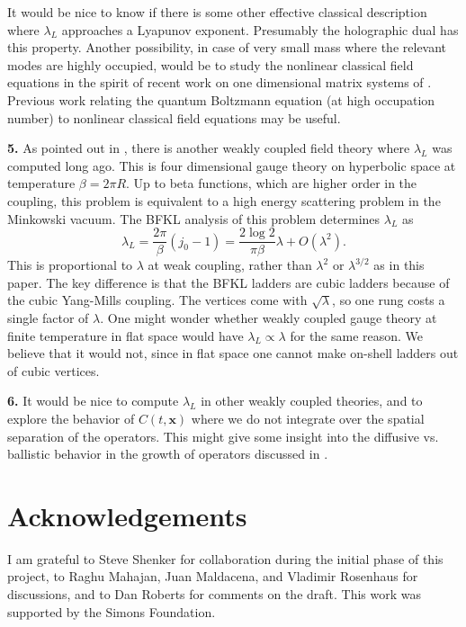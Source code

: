 \documentclass[12pt]{article}
\newcommand{\be}{\begin{equation}}
\newcommand{\ee}{\end{equation}}
\begin{document}
It would be nice to know if there is some other effective classical description where $\lambda_L$ approaches a Lyapunov exponent. Presumably the holographic dual has this property. Another possibility, in case of very small mass where the relevant modes are highly occupied, would be to study the nonlinear classical field equations in the spirit of recent work on one dimensional matrix systems of \cite{Gur-Ari:2015rcq}. Previous work \cite{Mueller:2002gd,Jeon:2004dh,Mathieu:2014aba} relating the quantum Boltzmann equation (at high occupation number) to nonlinear classical field equations may be useful.

{\bf 5.} As pointed out in \cite{Shenker:2014cwa}, there is another weakly coupled field theory where $\lambda_L$ was computed long ago. This is four dimensional gauge theory on hyperbolic space at temperature $\beta = 2\pi R$. Up to beta functions, which are higher order in the coupling, this problem is equivalent to a high energy scattering problem in the Minkowski vacuum. The BFKL analysis of this problem determines $\lambda_L$ as
\be
\lambda_L = \frac{2\pi}{\beta}(j_0 - 1) = \frac{2\log 2}{\pi \beta}\lambda + O(\lambda^2).
\ee
This is proportional to $\lambda$ at weak coupling, rather than $\lambda^2$ or $\lambda^{3/2}$ as in this paper. The key difference is that the BFKL ladders are cubic ladders because of the cubic Yang-Mills coupling. The vertices come with $\sqrt{\lambda}$, so one rung costs a single factor of $\lambda$. One might wonder whether weakly coupled gauge theory at finite temperature in flat space would have $\lambda_L \propto \lambda$ for the same reason. We believe that it would not, since in flat space one cannot make on-shell ladders out of cubic vertices.

{\bf 6. } It would be nice to compute $\lambda_L$ in other weakly coupled theories, and to explore the behavior of $C(t,\mathbf{x})$ where we do not integrate over the spatial separation of the operators. This might give some insight into the diffusive vs. ballistic behavior in the growth of operators discussed in \cite{Roberts:2014isa,Shenker:2014cwa}.

\section*{Acknowledgements}
I am grateful to Steve Shenker for collaboration during the initial phase of this project, to  Raghu Mahajan, Juan Maldacena, and Vladimir Rosenhaus for discussions, and to Dan Roberts for comments on the draft. This work was supported by the Simons Foundation.
\end{document}
